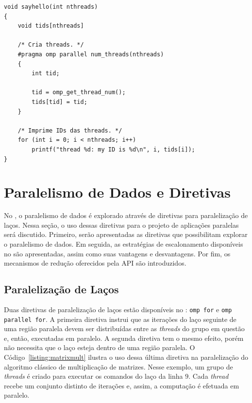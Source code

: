 \documentclass{SBCbookchapter}
\begin{document}
\begin{lstlisting}[frame=single, caption=Um exemplo simples com uma região paralela.,
label=listing:sayhello]
void sayhello(int nthreads)
{
	void tids[nthreads]

	/* Cria threads. */
	#pragma omp parallel num_threads(nthreads)
	{
		int tid;

		tid = omp_get_thread_num();
		tids[tid] = tid;
	}

	/* Imprime IDs das threads. */
	for (int i = 0; i < nthreads; i++)
		printf("thread %d: my ID is %d\n", i, tids[i]);
}
\end{lstlisting}

\section{Paralelismo de Dados e Diretivas \openmp}
\label{sec:paralelismo dados}

	No \openmp, o paralelismo de dados é explorado através de diretivas
	para paralelização de laços. Nessa seção, o uso dessas diretivas para o
	projeto de aplicações paralelas será discutido.
	Primeiro, serão apresentadas as diretivas que possibilitam explorar o
	paralelismo de dados. Em seguida, as estratégias de escalonamento
	disponíveis no \openmp são apresentadas, assim como suas vantagens e
	desvantagens. Por fim, os mecanismos de redução oferecidos pela API
	\openmp são introduzidos.

	\subsection{Paralelização de Laços}
	\label{subsection: paralelização de lacos}

		Duas diretivas de paralelização de laços estão disponíveis no
		\openmp: \texttt{omp for} e \texttt{omp parallel for}. A primeira
		diretiva instrui que as iterações do laço seguinte de uma região
		paralela devem ser distribuídas entre as \textit{threads} do grupo em questão
		e, então, executadas em paralelo. A segunda diretiva tem o mesmo
		efeito, porém não necessita que o laço esteja dentro de uma região
		paralela. O Código~\ref{listing:matrixmult} ilustra o uso dessa última
		diretiva na paralelização do algoritmo clássico de multiplicação de
		matrizes. Nesse exemplo, um grupo de \textit{threads} é criado para
		executar os comandos do laço da linha $9$. Cada \textit{thread}
		recebe um conjunto distinto de iterações e, assim, a
		computação é efetuada em paralelo. 
\end{document}
